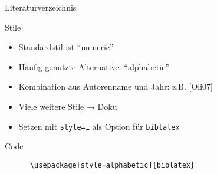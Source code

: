 \begin{frame}{Literaturverzeichnis}
  \nocite{*}
  \printbibliography[heading=none]
\end{frame}

\begin{frame}[fragile]{Stile}
  \begin{itemize}
    \item Standardstil ist \enquote{numeric}
    \item Häufig genutzte Alternative: \enquote{alphabetic}
    \item Kombination aus Autorenname und Jahr: z.B. [Oli07]
    \item Viele weitere Stile → Doku
    \item Setzen mit \texttt{style=…} als Option für \texttt{biblatex}
  \end{itemize}
  \begin{block}{Code}
    \begin{lstlisting}
      \usepackage[style=alphabetic]{biblatex}
    \end{lstlisting}
  \end{block}
\end{frame}

